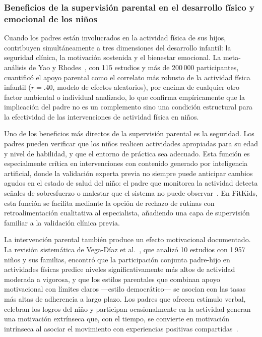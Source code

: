 				\subsubsection[Beneficios de la supervisión parental]{Beneficios de la supervisión parental en el desarrollo físico y emocional de los niños}
					Cuando los padres están involucrados en la actividad física de sus hijos, contribuyen simultáneamente a tres dimensiones del desarrollo infantil: la seguridad clínica, la motivación sostenida y el bienestar emocional. La meta-análisis de Yao y Rhodes~\cite{Yao2015}, con 115 estudios y más de 200\,000 participantes, cuantificó el apoyo parental como el correlato más robusto de la actividad física infantil ($r = .40$, modelo de efectos aleatorios), por encima de cualquier otro factor ambiental o individual analizado, lo que confirma empíricamente que la implicación del padre no es un complemento sino una condición estructural para la efectividad de las intervenciones de actividad física en niños.
					
					Uno de los beneficios más directos de la supervisión parental es la seguridad. Los padres pueden verificar que los niños realicen actividades apropiadas para su edad y nivel de habilidad, y que el entorno de práctica sea adecuado. Esta función es especialmente crítica en intervenciones con contenido generado por inteligencia artificial, donde la validación experta previa no siempre puede anticipar cambios agudos en el estado de salud del niño: el padre que monitorea la actividad detecta señales de sobresfuerzo o malestar que el sistema no puede observar~\cite{Yim2024}. En FitKids, esta función se facilita mediante la opción de rechazo de rutinas con retroalimentación cualitativa al especialista, añadiendo una capa de supervisión familiar a la validación clínica previa.
					
					La intervención parental también produce un efecto motivacional documentado. La revisión sistemática de Vega-Díaz et al.~\cite{VegaDiaz2023}, que analizó 10 estudios con 1\,957 niños y sus familias, encontró que la participación conjunta padre-hijo en actividades físicas predice niveles significativamente más altos de actividad moderada a vigorosa, y que los estilos parentales que combinan apoyo motivacional con límites claros ---estilo democrático--- se asocian con las tasas más altas de adherencia a largo plazo. Los padres que ofrecen estímulo verbal, celebran los logros del niño y participan ocasionalmente en la actividad generan una motivación extrínseca que, con el tiempo, se convierte en motivación intrínseca al asociar el movimiento con experiencias positivas compartidas~\cite{VegaDiaz2023,Yao2015}.
					
